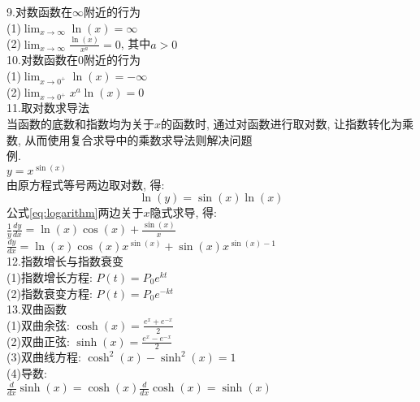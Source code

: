 \documentclass[UTF8, fontset=ubuntu]{ctexart}
\begin{document}
9.对数函数在$\infty$附近的行为\\[1ex]
(1)\quad$\displaystyle\lim_{x\to\infty}\ln(x)=\infty$\\[1ex]
(2)\quad$\displaystyle\lim_{x\to\infty}\frac{\ln(x)}{x^a}=0$, 其中$a>0$\\[1ex]

10.对数函数在0附近的行为\\[1ex]
(1)\quad$\displaystyle\lim_{x\to 0^+}\ln(x)=-\infty$\\[1ex]
(2)\quad$\displaystyle\lim_{x\to 0^+}x^a\ln(x)=0$\\[1ex]

11.取对数求导法\\
当函数的底数和指数均为关于$x$的函数时, 通过对函数进行取对数, 让指数转化为乘数, 从而使用复合求导中的乘数求导法则解决问题\\
例.\\[1ex]
$\displaystyle y=x^{\sin(x)}$\\[1ex]
由原方程式等号两边取对数, 得:\\
\begin{equation}
\ln(y)=\sin(x)\ln(x)\label{eq:logarithm}
\end{equation}
公式\eqref{eq:logarithm}两边关于$x$隐式求导, 得:\\[1ex]
$\displaystyle\frac{1}{y}\frac{dy}{dx}=\ln(x)\cos(x)+\frac{\sin(x)}{x}$\\[1ex]
$\displaystyle\frac{dy}{dx}=\ln(x)\cos(x)x^{\sin(x)}+\sin(x)x^{\sin(x)-1}$\\[1ex]

12.指数增长与指数衰变\\
(1)指数增长方程: $P(t)=P_0e^{kt}$\\
(2)指数衰变方程: $P(t)=P_0e^{-kt}$\\

13.双曲函数\\[1ex]
(1)双曲余弦: $\displaystyle\cosh(x)=\frac{e^x+e^{-x}}{2}$\\[1ex]
(2)双曲正弦: $\displaystyle\sinh(x)=\frac{e^x-e^{-x}}{2}$\\[1ex]
(3)双曲线方程: $\cosh^2(x)-\sinh^2(x)=1$\\[1ex]
(4)导数:\\[1ex]
$\displaystyle\frac{d}{dx}\sinh(x)=\cosh(x)$\qquad$\displaystyle\frac{d}{dx}\cosh(x)=\sinh(x)$\\[1ex]
\end{document}
